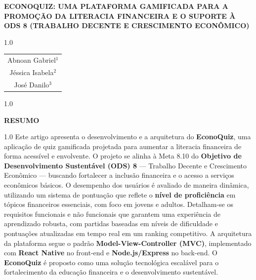 \documentclass[a4paper, 12pt]{article}
\begin{document}
\thispagestyle{empty}

\begin{center}
\vspace*{3cm}

\Large\textbf{\uppercase{EconoQuiz: Uma Plataforma Gamificada para a Promoção da Literacia Financeira e o Suporte à ODS 8 (Trabalho Decente e Crescimento Econômico)}}
\par
\vspace{2cm}

\normalsize
\begin{spacing}{1.0}
\begin{tabular}{c}
Abnoan Gabriel$^{1}$\\
Jéssica Isabela$^{2}$\\
José Danilo$^{3}$
\end{tabular}
\end{spacing}
\end{center}

\begin{spacing}{1.0}
\end{spacing}

\newpage
\thispagestyle{plain}

\begin{center}
\normalfont\normalsize\textbf{RESUMO}
\end{center}

\begin{spacing}{1.0}
\noindent Este artigo apresenta o desenvolvimento e a arquitetura do \textbf{EconoQuiz}, uma aplicação de quiz gamificada projetada para aumentar a literacia financeira de forma acessível e envolvente. O projeto se alinha à Meta 8.10 do \textbf{Objetivo de Desenvolvimento Sustentável (ODS) 8} — Trabalho Decente e Crescimento Econômico — buscando fortalecer a inclusão financeira e o acesso a serviços econômicos básicos. O desempenho dos usuários é avaliado de maneira dinâmica, utilizando um sistema de pontuação que reflete o \textbf{nível de proficiência} em tópicos financeiros essenciais, com foco em jovens e adultos. Detalham-se os requisitos funcionais e não funcionais que garantem uma experiência de aprendizado robusta, com partidas baseadas em níveis de dificuldade e pontuações atualizadas em tempo real em um ranking competitivo. A arquitetura da plataforma segue o padrão \textbf{Model-View-Controller (MVC)}, implementado com \textbf{React Native} no front-end e \textbf{Node.js/Express} no back-end. O \textbf{EconoQuiz} é proposto como uma solução tecnológica escalável para o fortalecimento da educação financeira e o desenvolvimento sustentável.
\end{spacing}
\end{document}
